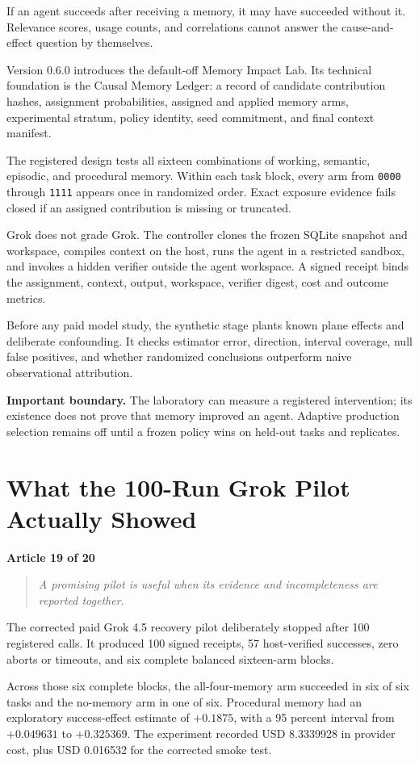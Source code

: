 \documentclass[11pt]{article}
\newcommand{\articlelabel}[1]{%
  \noindent\colorbox{aetnaTeal!10}{%
    \parbox{0.96\textwidth}{\color{aetnaInk}\small\textbf{Article #1 of 20}}}%
  \par\medskip}
\newcommand{\coreidea}[1]{%
  \begin{quote}\color{aetnaTeal}\large\itshape #1\end{quote}}
\newcommand{\boundary}[1]{%
  \par\smallskip\noindent\textbf{Important boundary.} #1}
\begin{document}
If an agent succeeds after receiving a memory, it may have succeeded without
it. Relevance scores, usage counts, and correlations cannot answer the
cause-and-effect question by themselves.

Version 0.6.0 introduces the default-off Memory Impact Lab. Its technical
foundation is the Causal Memory Ledger: a record of candidate contribution
hashes, assignment probabilities, assigned and applied memory arms,
experimental stratum, policy identity, seed commitment, and final context
manifest.

The registered design tests all sixteen combinations of working, semantic,
episodic, and procedural memory. Within each task block, every arm from
\texttt{0000} through \texttt{1111} appears once in randomized order. Exact
exposure evidence fails closed if an assigned contribution is missing or
truncated.

Grok does not grade Grok. The controller clones the frozen SQLite snapshot and
workspace, compiles context on the host, runs the agent in a restricted
sandbox, and invokes a hidden verifier outside the agent workspace. A signed
receipt binds the assignment, context, output, workspace, verifier digest,
cost and outcome metrics.

Before any paid model study, the synthetic stage plants known plane effects
and deliberate confounding. It checks estimator error, direction, interval
coverage, null false positives, and whether randomized conclusions outperform
naive observational attribution.

\boundary{The laboratory can measure a registered intervention; its existence
does not prove that memory improved an agent. Adaptive production selection
remains off until a frozen policy wins on held-out tasks and replicates.}

\clearpage
\section{What the 100-Run Grok Pilot Actually Showed}
\articlelabel{19}
\coreidea{A promising pilot is useful when its evidence and incompleteness are
reported together.}

The corrected paid Grok 4.5 recovery pilot deliberately stopped after 100
registered calls. It produced 100 signed receipts, 57 host-verified successes,
zero aborts or timeouts, and six complete balanced sixteen-arm blocks.

Across those six complete blocks, the all-four-memory arm succeeded in six of
six tasks and the no-memory arm in one of six. Procedural memory had an
exploratory success-effect estimate of \(+0.1875\), with a 95 percent interval
from \(+0.049631\) to \(+0.325369\). The experiment recorded USD 8.3339928 in
provider cost, plus USD 0.016532 for the corrected smoke test.
\end{document}
